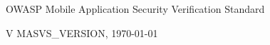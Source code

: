 \thispagestyle{empty} %

OWASP Mobile Application Security Verification Standard


V MASVS_VERSION, \today